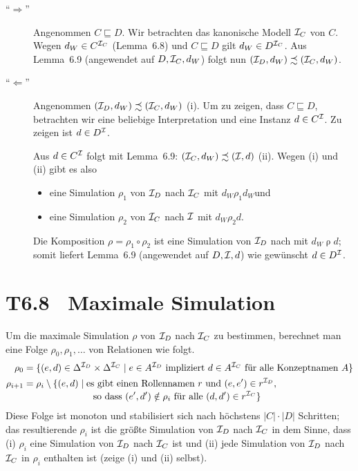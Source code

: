 \documentclass[fontsize=11pt, twoside=false, numbers=autoenddot]{scrbook}
\begin{document}
\begin{description}
  \item[{\boldmath "`$\Rightarrow$"'}] 
    Angenommen $C \sqsubseteq D$.
    Wir betrachten das kanonische Modell $\mathcal{I}_C$ von $C$.
    Wegen $d_W \in C^{\mathcal{I}_C}$ (Lemma~6.8) und $C \sqsubseteq D$ gilt $d_W \in D^{\mathcal{I}_C}$.
    Aus Lemma~6.9 (angewendet auf $D,\mathcal{I}_C,d_W$) folgt nun
    $(\mathcal{I}_D,d_W) \precsim (\mathcal{I}_C,d_W)$.
  \item[{\boldmath "`$\Leftarrow$"'}] 
    Angenommen $(\mathcal{I}_D,d_W) \precsim (\mathcal{I}_C,d_W)$ (i).
    Um zu zeigen, dass $C \sqsubseteq D$,
    betrachten wir eine beliebige Interpretation \Imc und eine Instanz $d \in C^\mathcal{I}$.
    Zu zeigen ist $d \in D^\mathcal{I}$.
    
    Aus $d \in C^\mathcal{I}$ folgt mit Lemma~6.9: $(\mathcal{I}_C,d_W) \precsim (\mathcal{I},d)$ (ii).
    Wegen (i) und (ii) gibt es also
    \begin{itemize}
      \item
        eine Simulation $\rho_1$ von $\mathcal{I}_D$ nach $\mathcal{I}_C$ mit $d_W \mathrel{\rho_1} d_W$\quad und
      \item
        eine Simulation $\rho_2$ von $\mathcal{I}_C$ nach $\mathcal{I}$ mit $d_W \mathrel{\rho_2} d$.
    \end{itemize}
    Die Komposition $\rho = \rho_1 \circ \rho_2$ ist eine Simulation von $\mathcal{I}_D$
    nach \Imc mit $d_W \mathrel{\rho} d$;
    somit liefert Lemma~6.9 (angewendet auf $D,\mathcal{I},d$) wie gewünscht $d \in D^\mathcal{I}$.
    \qedhere
\end{description}

\section*{T6.8~ Maximale Simulation}

Um die maximale Simulation $\rho$ von $\mathcal{I}_D$ nach $\mathcal{I}_C$ zu bestimmen,
berechnet man eine Folge $\rho_0,\rho_1,\dots$ von Relationen wie folgt.
%
\begin{align*}
  \rho_0 & = \{(e,d) \in \Delta^{\Imc_D} \times \Delta^{\Imc_C} \mid e \in A^{\Imc_D} \text{~impliziert~} d \in A^{\Imc_C} \text{~für alle Konzeptnamen $A$}\} \\
  \rho_{i+1} & = \rho_i \setminus \{(e,d) \mid \text{es gibt einen Rollennamen $r$ und~} (e,e') \in r^{\Imc_D}, \\[-1mm]
                     & \hspace*{26mm} \text{so dass~} (e',d') \notin \rho_i \text{~für alle~} (d,d') \in r^{\Imc_C}\}
\end{align*}
%
Diese Folge ist monoton und stabilisiert sich nach höchstens $|C|\cdot|D|$ Schritten;
das resultierende $\rho_i$ ist die größte Simulation von $\mathcal{I}_D$ nach $\mathcal{I}_C$
in dem Sinne, dass (i) $\rho_i$ eine Simulation von $\mathcal{I}_D$ nach $\mathcal{I}_C$ ist und
(ii) jede Simulation von $\mathcal{I}_D$ nach $\mathcal{I}_C$ in $\rho_i$ enthalten ist
(zeige (i) und (ii) selbst).
\end{document}
